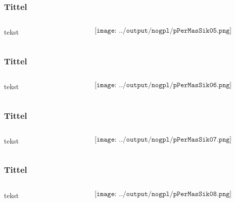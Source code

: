 \documentclass[aspectratio=169,xcolor=dvipsnames]{beamer}
\begin{document}
\begin{frame}
	\frametitle{Tittel}
	\begin{columns}
		\begin{column}{0.5\textwidth}
tekst
			
		\end{column}

		\begin{column}{0.5\textwidth}
	$$\texttt{[image: ../output/nogpl/pPerMasSik05.png]}$$
		\end{column}
	\end{columns}
\end{frame}

\begin{frame}
	\frametitle{Tittel}
	\begin{columns}
		\begin{column}{0.5\textwidth}
tekst
			
		\end{column}

		\begin{column}{0.5\textwidth}
	$$\texttt{[image: ../output/nogpl/pPerMasSik06.png]}$$
		\end{column}
	\end{columns}
\end{frame}

\begin{frame}
	\frametitle{Tittel}
	\begin{columns}
		\begin{column}{0.5\textwidth}
tekst
			
		\end{column}

		\begin{column}{0.5\textwidth}
	$$\texttt{[image: ../output/nogpl/pPerMasSik07.png]}$$
		\end{column}
	\end{columns}
\end{frame}

\begin{frame}
	\frametitle{Tittel}
	\begin{columns}
		\begin{column}{0.5\textwidth}
tekst
			
		\end{column}

		\begin{column}{0.5\textwidth}
	$$\texttt{[image: ../output/nogpl/pPerMasSik08.png]}$$
		\end{column}
	\end{columns}
\end{frame}
\end{document}
